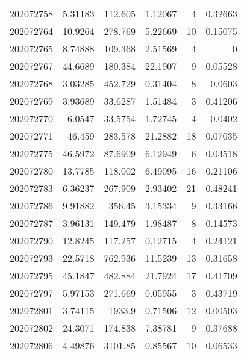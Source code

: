 \begin{tabular}{rrrrrr}
 202072758 &          5.31183 &      112.605  &            1.12067 &           4 & 0.32663 \\
 202072764 &         10.9264  &      278.769  &            5.22669 &          10 & 0.15075 \\
 202072765 &          8.74888 &      109.368  &            2.51569 &           4 & 0       \\
 202072767 &         44.6689  &      180.384  &           22.1907  &           9 & 0.05528 \\
 202072768 &          3.03285 &      452.729  &            0.31404 &           8 & 0.0603  \\
 202072769 &          3.93689 &       33.6287 &            1.51484 &           3 & 0.41206 \\
 202072770 &          6.0547  &       33.5754 &            1.72745 &           4 & 0.0402  \\
 202072771 &         46.459   &      283.578  &           21.2882  &          18 & 0.07035 \\
 202072775 &         46.5972  &       87.6909 &            6.12949 &           6 & 0.03518 \\
 202072780 &         13.7785  &      118.002  &            6.49095 &          16 & 0.21106 \\
 202072783 &          6.36237 &      267.909  &            2.93402 &          21 & 0.48241 \\
 202072786 &          9.91882 &      356.45   &            3.15334 &           9 & 0.33166 \\
 202072787 &          3.96131 &      149.479  &            1.98487 &           8 & 0.14573 \\
 202072790 &         12.8245  &      117.257  &            0.12715 &           4 & 0.24121 \\
 202072793 &         22.5718  &      762.936  &           11.5239  &          13 & 0.31658 \\
 202072795 &         45.1847  &      482.884  &           21.7924  &          17 & 0.41709 \\
 202072797 &          5.97153 &      271.669  &            0.05955 &           3 & 0.43719 \\
 202072801 &          3.74115 &     1933.9    &            0.71506 &          12 & 0.00503 \\
 202072802 &         24.3071  &      174.838  &            7.38781 &           9 & 0.37688 \\
 202072806 &          4.49876 &     3101.85   &            0.85567 &          10 & 0.06533 \\

\end{tabular}
